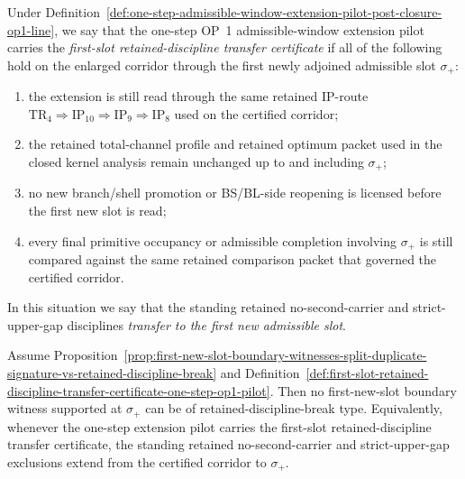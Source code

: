 \begin{definition}
\label{def:first-slot-retained-discipline-transfer-certificate-one-step-op1-pilot}
Under Definition~\ref{def:one-step-admissible-window-extension-pilot-post-closure-op1-line}, we say that the one-step OP~1 admissible-window extension pilot carries the \emph{first-slot retained-discipline transfer certificate} if all of the following hold on the enlarged corridor through the first newly adjoined admissible slot $\sigma_{+}$:
\begin{enumerate}[leftmargin=2em,label=(\roman*)]
 \item the extension is still read through the same retained IP-route \(\mathrm{TR}_4 \Rightarrow \mathrm{IP}_{10} \Rightarrow \mathrm{IP}_9 \Rightarrow \mathrm{IP}_8\) used on the certified corridor;
 \item the retained total-channel profile and retained optimum packet used in the closed kernel analysis remain unchanged up to and including $\sigma_{+}$;
 \item no new branch/shell promotion or BS/BL-side reopening is licensed before the first new slot is read;
 \item every final primitive occupancy or admissible completion involving $\sigma_{+}$ is still compared against the same retained comparison packet that governed the certified corridor.
\end{enumerate}
In this situation we say that the standing retained no-second-carrier and strict-upper-gap disciplines \emph{transfer to the first new admissible slot}.
\end{definition}

\begin{proposition}
\label{prop:first-slot-transfer-removes-retained-discipline-break-channel-sigma-plus}
Assume Proposition~\ref{prop:first-new-slot-boundary-witnesses-split-duplicate-signature-vs-retained-discipline-break} and Definition~\ref{def:first-slot-retained-discipline-transfer-certificate-one-step-op1-pilot}. Then no first-new-slot boundary witness supported at $\sigma_{+}$ can be of retained-discipline-break type. Equivalently, whenever the one-step extension pilot carries the first-slot retained-discipline transfer certificate, the standing retained no-second-carrier and strict-upper-gap exclusions extend from the certified corridor to $\sigma_{+}$.
\end{proposition}

